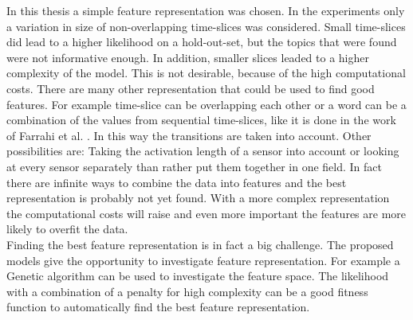 In this thesis a simple feature representation was chosen. In the experiments only a variation in size of non-overlapping time-slices was considered. Small time-slices did lead to a higher likelihood on a hold-out-set, but the topics that were found were not informative enough. In addition, smaller slices leaded to a higher complexity of the model. This is not desirable, because of the high computational costs.
There are many other representation that could be used to find good features. For example time-slice can be overlapping each other or a word can be a combination of the values from sequential time-slices, like it is done in the work of Farrahi et al. \cite{farrahi2008daily}. In this way the transitions are taken into account. Other possibilities are: Taking the activation length of a sensor into account or looking at every sensor separately than rather put them together in one field. In fact there are infinite ways to combine the data into features and the best representation is probably not yet found. With a more complex representation the computational costs will raise and even more important the features are more likely to overfit the data.\\

Finding the best feature representation is in fact a big challenge. The proposed models give the opportunity to investigate feature representation. For example a Genetic algorithm can be used to investigate the feature space. The likelihood with a combination of a penalty for high complexity can be a good fitness function to automatically find the best feature representation.














